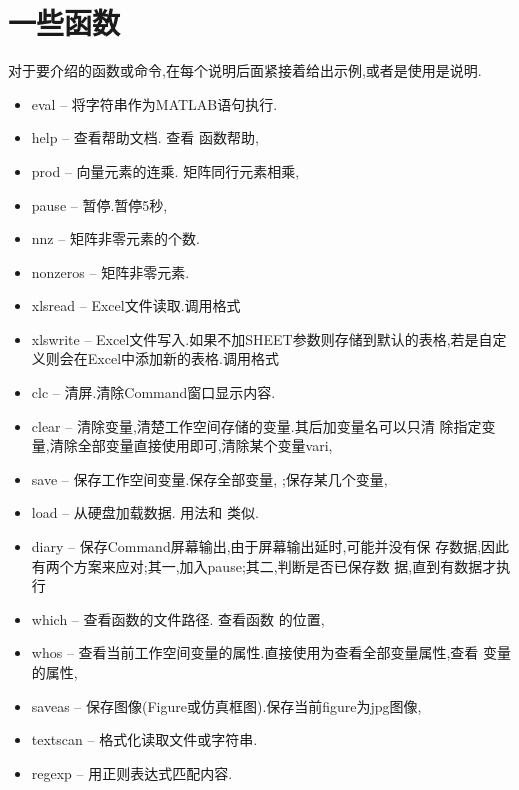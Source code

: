 \section{一些函数}
对于要介绍的函数或命令,在每个说明后面紧接着给出示例,或者是使用是说明.

\begin{itemize}
\item{eval} -- 将字符串作为MATLAB语句执行. 
\item{help} -- 查看帮助文档. 查看  函数帮助, 
\item{prod} -- 向量元素的连乘. 矩阵同行元素相乘, 
\item{pause} -- 暂停.暂停5秒, 
\item{nnz} -- 矩阵非零元素的个数. 
\item{nonzeros} -- 矩阵非零元素. 
\item{xlsread} -- Excel文件读取.调用格式 
\item{xlswrite} -- Excel文件写入.如果不加SHEET参数则存储到默认的表格,若是自定义则会在Excel中添加新的表格.调用格式 
\item{clc} -- 清屏.清除Command窗口显示内容. 
\item{clear} -- 清除变量,清楚工作空间存储的变量.其后加变量名可以只清
除指定变量,清除全部变量直接使用即可,清除某个变量vari, 
\item{save} -- 保存工作空间变量.保存全部变量, ;保存某几个变量,\\
\item{load} -- 从硬盘加载数据. 用法和  类似.
\item{diary} -- 保存Command屏幕输出,由于屏幕输出延时,可能并没有保
存数据,因此有两个方案来应对;其一,加入pause;其二,判断是否已保存数
据,直到有数据才执行 
\item{which} -- 查看函数的文件路径. 查看函数  的位置, 
\item{whos} -- 查看当前工作空间变量的属性.直接使用为查看全部变量属性,查看  变量的属性, 
\item{saveas} -- 保存图像(Figure或仿真框图).保存当前figure为jpg图像, \\
\item{textscan} -- 格式化读取文件或字符串.
\item{regexp} -- 用正则表达式匹配内容.
\end{itemize}